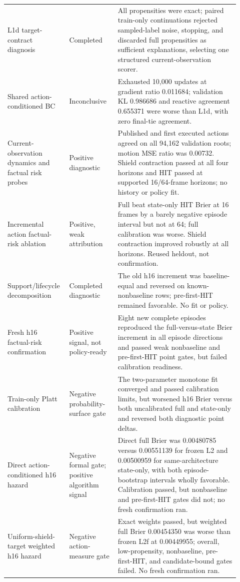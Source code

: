 \documentclass[11pt]{article}
\begin{document}
\begin{longtable}{@{}>{\raggedright\arraybackslash}p{0.22\linewidth}
                       >{\raggedright\arraybackslash}p{0.20\linewidth}
                       >{\raggedright\arraybackslash}p{0.50\linewidth}@{}}
L1d target-contract diagnosis & Completed & All propensities were exact; paired train-only continuations rejected sampled-label noise, stopping, and discarded full propensities as sufficient explanations, selecting one structured current-observation scorer. \\
Shared action-conditioned BC & Inconclusive & Exhausted 10,000 updates at gradient ratio 0.011684; validation KL 0.986686 and reactive agreement 0.655371 were worse than L1d, with zero final-tie agreement. \\
Current-observation dynamics and factual risk probes & Positive diagnostic & Published and first executed actions agreed on all 94,162 validation roots; motion MSE ratio was 0.00732. Shield contraction passed at all four horizons and HIT passed at supported 16/64-frame horizons; no history or policy fit. \\
Incremental action factual-risk ablation & Positive, weak attribution & Full beat state-only HIT Brier at 16 frames by a barely negative episode interval but not at 64; full calibration was worse. Shield contraction improved robustly at all horizons. Reused heldout, not confirmation. \\
Support/lifecycle decomposition & Completed diagnostic & The old h16 increment was baseline-equal and reversed on known-nonbaseline rows; pre-first-HIT remained favorable.  No fit or policy. \\
Fresh h16 factual-risk confirmation & Positive signal, not policy-ready & Eight new complete episodes reproduced the full-versus-state Brier increment in all episode directions and passed weak nonbaseline and pre-first-HIT point gates, but failed calibration readiness. \\
Train-only Platt calibration & Negative probability-surface gate & The two-parameter monotone fit converged and passed calibration limits, but worsened h16 Brier versus both uncalibrated full and state-only and reversed both diagnostic point deltas. \\
Direct action-conditioned h16 hazard & Negative formal gate; positive algorithm signal & Direct full Brier was 0.00480785 versus 0.00551139 for frozen L2 and 0.00500959 for same-architecture state-only, with both episode-bootstrap intervals wholly favorable.  Calibration passed, but nonbaseline and pre-first-HIT gates did not; no fresh confirmation ran. \\
Uniform-shield-target weighted h16 hazard & Negative action-measure gate & Exact weights passed, but weighted full Brier 0.00454350 was worse than frozen L2f at 0.00449955; overall, low-propensity, nonbaseline, pre-first-HIT, and candidate-bound gates failed.  No fresh confirmation ran. \\

\end{longtable}
\end{document}
